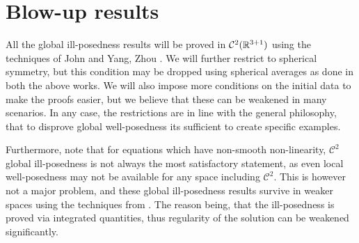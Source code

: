 \documentclass[11pt, oneside]{amsart}
\begin{document}
	\section{Blow-up results}\label{blow up results}
	All the global ill-posedness results will be proved in $\mathcal{C}^2(\mathbb{R}^{3+1})$ using the techniques of John \cite{john_blow-up_1979} and Yang, Zhou \cite{yang_revisit_2016}. We will further restrict to spherical symmetry, but this condition may be dropped using spherical averages as done in both the above works. We will also impose more conditions on the initial data to make the proofs easier, but we believe that these can be weakened in many scenarios. In any case, the restrictions are in line with the general philosophy, that to disprove global well-posedness its sufficient to create specific examples. 
	
	Furthermore, note that for equations which have non-smooth non-linearity, $\mathcal{C}^2$ global ill-posedness is not always the most satisfactory statement, as even local well-posedness may not be available for any space including $\mathcal{C}^2$. This is however not a major problem, and these global ill-posedness results survive in weaker spaces using the techniques from \cite{hidano_life_2016}. The reason being, that the ill-posedness is proved via integrated quantities, thus regularity of the solution can be weakened significantly.
	
\end{document}
